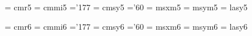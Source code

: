  \font\fivrm  = cmr5               %
 \font\fivmi  = cmmi5              %
    \skewchar\fivmi ='177          %
 \font\fivsy  = cmsy5              %
    \skewchar\fivsy ='60           %
 \font\fivxm  = msxm5		   %
 \font\fivym  = msym5		   %
 \font\fivly  = lasy5             %

 \font\sixrm  = cmr6               %
 \font\sixmi  = cmmi6              %
    \skewchar\sixmi ='177          %
 \font\sixsy  = cmsy6              %
    \skewchar\sixsy ='60           %
 \font\sixxm  = msxm6		   %
 \font\sixym  = msym6		   %
 \font\sixly  = lasy6             %

